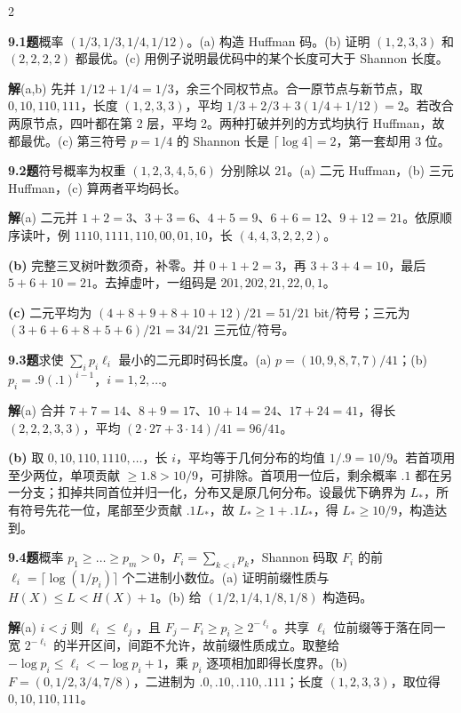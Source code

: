 \documentclass[a4paper]{article}
\newcommand{\cols}{2}
\newcommand{\cols}{4}
\newcommand{\topic}[1]{\par\addvspace{2.6pt}{\color{ink}\bfseries #1}\par\nobreak}
\newcommand{\problem}[2]{\par\addvspace{1.4pt}\textcolor{ink}{\textbf{#1}}\enspace\textbf{题}\enspace #2\par\nobreak}
\newcommand{\solve}{\noindent\textbf{解}\enspace}
\newcommand{\parta}[1]{\par\noindent\textbf{(#1)}\enspace}
\begin{document}
\begin{multicols}{\cols}
\topic{Tut 9 · Shannon 与最优码}
\problem{9.1}{概率 $(1/3,1/3,1/4,1/12)$。(a) 构造 Huffman 码。(b) 证明 $(1,2,3,3)$ 和 $(2,2,2,2)$ 都最优。(c) 用例子说明最优码中的某个长度可大于 Shannon 长度。}
\solve (a,b) 先并 $1/12+1/4=1/3$，余三个同权节点。合一原节点与新节点，取 $0,10,110,111$，长度 $(1,2,3,3)$，平均 $1/3+2/3+3(1/4+1/12)=2$。若改合两原节点，四叶都在第 2 层，平均 2。两种打破并列的方式均执行 Huffman，故都最优。(c) 第三符号 $p=1/4$ 的 Shannon 长是 $\lceil\log4\rceil=2$，第一套却用 3 位。
\problem{9.2}{符号概率为权重 $(1,2,3,4,5,6)$ 分别除以 21。(a) 二元 Huffman，(b) 三元 Huffman，(c) 算两者平均码长。}
\solve (a) 二元并 $1+2=3$、$3+3=6$、$4+5=9$、$6+6=12$、$9+12=21$。依原顺序读叶，例 $1110,1111,110,00,01,10$，长 $(4,4,3,2,2,2)$。
\parta{b} 完整三叉树叶数须奇，补零。并 $0+1+2=3$，再 $3+3+4=10$，最后 $5+6+10=21$。去掉虚叶，一组码是 $201,202,21,22,0,1$。
\parta{c} 二元平均为 $(4+8+9+8+10+12)/21=51/21$ bit/符号；三元为 $(3+6+6+8+5+6)/21=34/21$ 三元位/符号。
\problem{9.3}{求使 $\sum_i p_i\ell_i$ 最小的二元即时码长度。(a) $p=(10,9,8,7,7)/41$；(b) $p_i=.9(.1)^{i-1}$，$i=1,2,\ldots$。}
\solve (a) 合并 $7+7=14$、$8+9=17$、$10+14=24$、$17+24=41$，得长 $(2,2,2,3,3)$，平均 $(2\cdot27+3\cdot14)/41=96/41$。
\parta{b} 取 $0,10,110,1110,\ldots$，长 $i$，平均等于几何分布的均值 $1/.9=10/9$。若首项用至少两位，单项贡献 $\ge1.8>10/9$，可排除。首项用一位后，剩余概率 $.1$ 都在另一分支；扣掉共同首位并归一化，分布又是原几何分布。设最优下确界为 $L_*$，所有符号先花一位，尾部至少贡献 $.1L_*$，故 $L_*\ge1+.1L_*$，得 $L_*\ge10/9$，构造达到。
\problem{9.4}{概率 $p_1\ge\dots\ge p_m>0$，$F_i=\sum_{k<i}p_k$，Shannon 码取 $F_i$ 的前 $\ell_i=\lceil\log(1/p_i)\rceil$ 个二进制小数位。(a) 证明前缀性质与 $H(X)\le L<H(X)+1$。(b) 给 $(1/2,1/4,1/8,1/8)$ 构造码。}
\solve (a) $i<j$ 则 $\ell_i\le\ell_j$，且 $F_j-F_i\ge p_i\ge2^{-\ell_i}$。共享 $\ell_i$ 位前缀等于落在同一宽 $2^{-\ell_i}$ 的半开区间，间距不允许，故前缀性质成立。取整给 $-\log p_i\le\ell_i<-\log p_i+1$，乘 $p_i$ 逐项相加即得长度界。(b) $F=(0,1/2,3/4,7/8)$，二进制为 $.0,.10,.110,.111$；长度 $(1,2,3,3)$，取位得 $0,10,110,111$。


\end{multicols}
\end{document}
